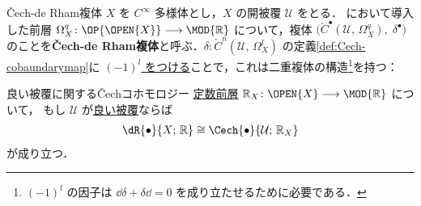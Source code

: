 \documentclass[TQFT_main]{subfiles}
\begin{document}
\begin{myexample}[label=ex:Cech-deRham]{\v{C}ech-de Rham複体}
    $X$ を $C^\infty$ 多様体とし，$X$ の開被覆 $\mathcal{U}$ をとる．
    において導入した前層 $\Omega^q_X \colon \OP{\OPEN{X}} \lto \MOD{\mathbb{R}}$ について，複体
    $\bigl( \check{C}^\bullet(\mathcal{U},\, \Omega^q_X),\; \delta^\bullet \bigr)$ のことを\textbf{\v{C}ech-de Rham複体}と呼ぶ．$\delta \colon \check{C}^{n}(\mathcal{U},\, \Omega^l_X)$ の定義\eqref{def:Cech-cobaundarymap}に \underline{$(-1)^{l}$ をつける}ことで，これは二重複体の構造\footnote{$(-1)^l$ の因子は $\dd{\delta} + \delta \dd = 0$ を成り立たせるために必要である．}を持つ：
    \begin{center}
    \end{center}
    
\end{myexample}

\begin{myprop}[label=prop:Cech-good-cover]{良い被覆に関する\v{C}echコホモロジー}
    \hyperref[ex:constant-presheaf]{定数前層} $\mathbb{R}_X \colon \OPEN{X} \lto \MOD{\mathbb{R}}$ について，
    もし $\mathcal{U}$ が\hyperref[def:good-cover]{良い被覆}ならば
    \begin{align}
        \dR{\bullet}{X;\, \mathbb{R}} \cong \Cech{\bullet}{\mathcal{U};\, \mathbb{R}_X}
    \end{align}
    が成り立つ．
\end{myprop}
\end{document}
